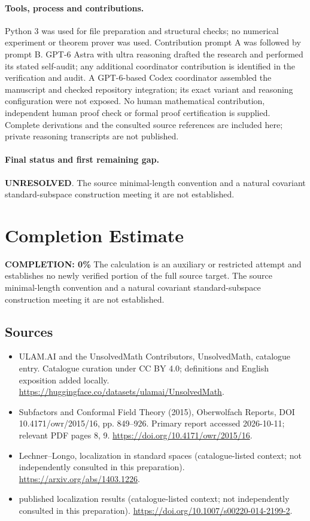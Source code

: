 \documentclass[11pt]{article}
\begin{document}
\paragraph{Tools, process and contributions.}
Python 3 was used for file preparation and structural checks; no numerical experiment or theorem prover was used. Contribution prompt A was followed by prompt B. GPT-6 Astra with ultra reasoning drafted the research and performed its stated self-audit; any additional coordinator contribution is identified in the verification and audit. A GPT-6-based Codex coordinator assembled the manuscript and checked repository integration; its exact variant and reasoning configuration were not exposed. No human mathematical contribution, independent human proof check or formal proof certification is supplied. Complete derivations and the consulted source references are included here; private reasoning transcripts are not published.

\paragraph{Final status and first remaining gap.}
\textbf{UNRESOLVED}. The source minimal-length convention and a natural covariant standard-subspace construction meeting it are not established.

\section{Completion Estimate}
\noindent\textbf{COMPLETION: 0\%}
The calculation is an auxiliary or restricted attempt and establishes no newly verified portion of the full source target. The source minimal-length convention and a natural covariant standard-subspace construction meeting it are not established.

\subsection{Sources}
\begin{itemize}
\item[\hypertarget{source:statement:1}{S1}] ULAM.AI and the UnsolvedMath Contributors, UnsolvedMath, catalogue entry. Catalogue curation under CC BY 4.0; definitions and English exposition added locally.
\url{https://huggingface.co/datasets/ulamai/UnsolvedMath}.
\item[\hypertarget{source:statement:2}{S2}] Subfactors and Conformal Field Theory (2015), Oberwolfach Reports, DOI 10.4171/owr/2015/16, pp. 849--926. Primary report accessed 2026-10-11; relevant PDF pages 8, 9.
\url{https://doi.org/10.4171/owr/2015/16}.
\item[\hypertarget{source:statement:3}{S3}] Lechner--Longo, localization in standard spaces (catalogue-listed context; not independently consulted in this preparation).
\url{https://arxiv.org/abs/1403.1226}.
\item[\hypertarget{source:statement:4}{S4}] published localization results (catalogue-listed context; not independently consulted in this preparation).
\url{https://doi.org/10.1007/s00220-014-2199-2}.
\end{itemize}
\label{end:statement}
\end{document}
